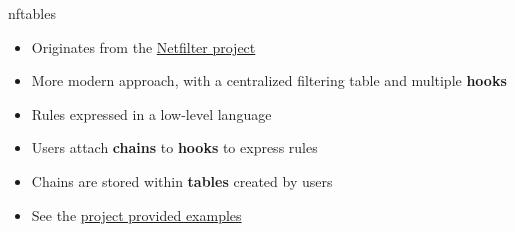 \begin{frame}{nftables}
	\begin{itemize}
		\item Originates from the \href{https://www.netfilter.org/}{Netfilter project}
		\item More modern approach, with a centralized filtering table and multiple \textbf{hooks}
		\item Rules expressed in a low-level language
		\item Users attach \textbf{chains} to \textbf{hooks} to express rules
		\item Chains are stored within \textbf{tables} created by users
		\item See the \href{https://wiki.nftables.org/wiki-nftables/index.php/Simple_ruleset_for_a_server}{project provided examples}
	\end{itemize}
\end{frame}

